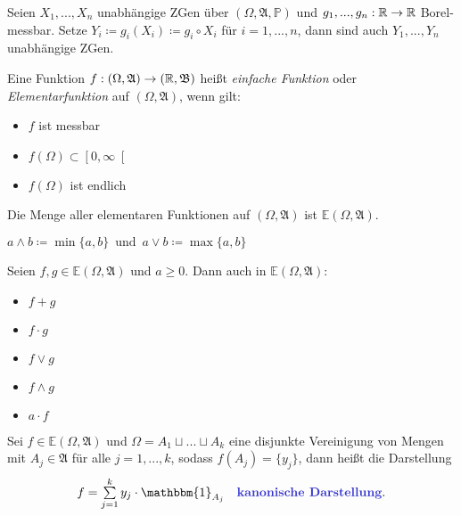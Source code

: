 \documentclass{cheat-sheet}
\newcommand{\Alg}{\mathfrak{A}} %
\renewcommand{\P}{\mathbb{P}} %
\newcommand{\E}{\mathbb{E}} %
\newcommand{\Bor}{\mathfrak{B}} %
\newcommand{\ind}{\mathbbm{1}} %
\begin{document}
\begin{satz}
  Seien $X_1, ..., X_n$ unabhängige ZGen über $(\Omega, \Alg, \P)$ und $g_1, ..., g_n : \mathbb{R} \to \mathbb{R}$ Borel-messbar. Setze $Y_i \coloneqq g_i(X_i) \coloneqq g_i \circ X_i$ für $i = 1, ..., n$, dann sind auch $Y_1, ..., Y_n$ unabhängige ZGen.
\end{satz}


\begin{defn}
  Eine Funktion $f : (\Omega, \Alg) \to (\R, \Bor)$ heißt \emph{einfache Funktion} oder \emph{Elementarfunktion} auf $(\Omega, \Alg)$, wenn gilt:
  \begin{multicols}{3}
    \begin{itemize}
      \item $f$ ist messbar
      \item $f(\Omega) \subset \left[0, \infty\right[$
      \item $f(\Omega)$ ist endlich
    \end{itemize}
  \end{multicols}
  Die Menge aller elementaren Funktionen auf $(\Omega, \Alg)$ ist $\E(\Omega, \Alg)$.
\end{defn}

\begin{nota}
  $a \wedge b \coloneqq \min \{a, b\} \enspace \text{und} \enspace a \vee b \coloneqq \max \{a, b\}$
\end{nota}

\begin{satz}
  Seien $f, g \in \E(\Omega, \Alg)$ und $a \geq 0$. Dann auch in $\E(\Omega, \Alg)$:
  \begin{multicols}{5}
    \begin{itemize}
      \item $f + g$
      \item $f \cdot g$
      \item $f \vee g$
      \item $f \wedge g$
      \item $a \cdot f$
    \end{itemize}
  \end{multicols}
\end{satz}

\begin{defn}
  Sei $f \in \E(\Omega, \Alg)$ und $\Omega = A_1 \sqcup ... \sqcup A_k$ eine disjunkte Vereinigung von Mengen mit $A_j \in \Alg$ für alle $j = 1, ..., k$, sodass $f(A_j) = \{ y_j \}$, dann heißt die Darstellung
  \[ f = \sum_{j=1}^k y_j \cdot \ind_{A_j} \quad \text{\emph{kanonische Darstellung}.} \]
\end{defn}
\end{document}
